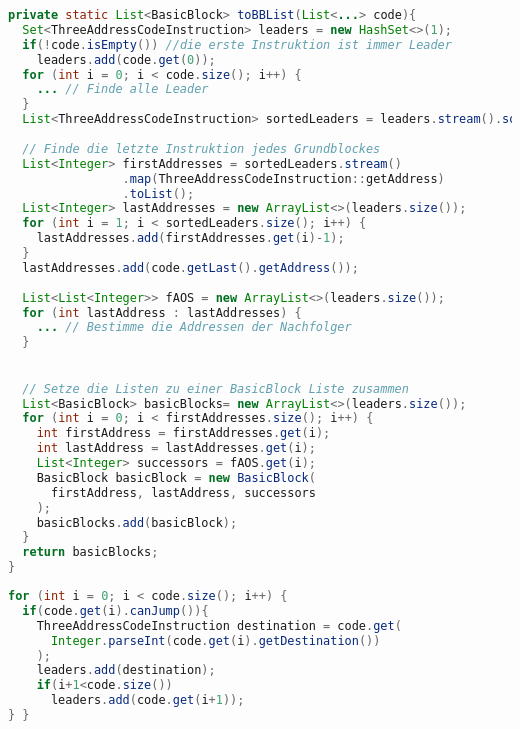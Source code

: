 \begin{lstlisting}[language=Java, caption={Zusammenfassung der toBBList() Methode}, label={cde:bb-gen}]
private static List<BasicBlock> toBBList(List<...> code){
  Set<ThreeAddressCodeInstruction> leaders = new HashSet<>(1);
  if(!code.isEmpty()) //die erste Instruktion ist immer Leader
    leaders.add(code.get(0));
  for (int i = 0; i < code.size(); i++) {
    ... // Finde alle Leader 
  }
  List<ThreeAddressCodeInstruction> sortedLeaders = leaders.stream().sorted(Comparator.comparingInt(ThreeAddressCodeInstruction::getAddress)).toList();
  
  // Finde die letzte Instruktion jedes Grundblockes
  List<Integer> firstAddresses = sortedLeaders.stream()
                .map(ThreeAddressCodeInstruction::getAddress)
                .toList();
  List<Integer> lastAddresses = new ArrayList<>(leaders.size());
  for (int i = 1; i < sortedLeaders.size(); i++) {
    lastAddresses.add(firstAddresses.get(i)-1);
  }
  lastAddresses.add(code.getLast().getAddress());
  
  List<List<Integer>> fAOS = new ArrayList<>(leaders.size());
  for (int lastAddress : lastAddresses) {
    ... // Bestimme die Addressen der Nachfolger
  }
 

  // Setze die Listen zu einer BasicBlock Liste zusammen
  List<BasicBlock> basicBlocks= new ArrayList<>(leaders.size());
  for (int i = 0; i < firstAddresses.size(); i++) {
    int firstAddress = firstAddresses.get(i);
    int lastAddress = lastAddresses.get(i);
    List<Integer> successors = fAOS.get(i);
    BasicBlock basicBlock = new BasicBlock(
      firstAddress, lastAddress, successors
    );
    basicBlocks.add(basicBlock);
  }
  return basicBlocks;
}
\end{lstlisting}
\newpage

\begin{lstlisting}[language=Java, caption={Ausschnitt der toBBList()-Methode zum finden aller Leader}, label={cde:bb-leader}]
for (int i = 0; i < code.size(); i++) {
  if(code.get(i).canJump()){
    ThreeAddressCodeInstruction destination = code.get(
      Integer.parseInt(code.get(i).getDestination())
    );
    leaders.add(destination);
    if(i+1<code.size()) 
      leaders.add(code.get(i+1));
} }
\end{lstlisting}

